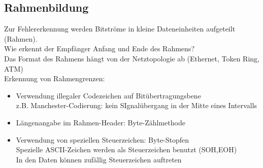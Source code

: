 \documentclass{scrreprt}
\begin{document}
\subsection{Rahmenbildung}
Zur Fehlererkennung werden Bitströme in kleine Dateneinheiten aufgeteilt (Rahmen).
\\Wie erkennt der Empfänger Anfang und Ende des Rahmens?
\\Das Format des Rahmens hängt von der Netztopologie ab (Ethernet, Token Ring, ATM)
\\Erkennung von Rahmengrenzen:
\begin{itemize}
	\item Verwendung illegaler Codezeichen auf Bitübertragungsbene
	\\z.B. Manchester-Codierung: kein SIgnalübergang in der Mitte eines Intervalls
	\item Längenangabe im Rahmen-Header: Byte-Zählmethode
	\item Verwendung von speziellen Steuerzeichen: Byte-Stopfen
	\\ Spezielle ASCII-Zeichen werden als Steuerzeichen benutzt (SOH,EOH)
	\\In den Daten können zufällig Steuerzeichen auftreten
\end{itemize}
\end{document}
